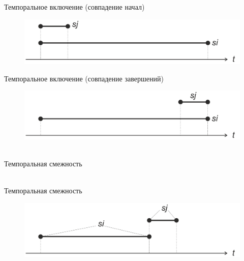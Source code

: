 \begin{frame}{Темпоральное включение (совпадение начал)}
	\topline
	\justifying
	\vspace{10mm}
	\begin{SCn}
		\begin{figure}[H]
			\includegraphics[scale=0.6]{./figures/sd_temp_entities/img_temporal_include_with_match_start_points.png}
		\end{figure}
	\end{SCn}
\end{frame}

\begin{frame}{Темпоральное включение (совпадение завершений)}
	\topline
	\justifying
	\vspace{10mm}
	\begin{SCn}
		\begin{figure}[H]
			\includegraphics[scale=0.6]{./figures/sd_temp_entities/img_temporal_include_with_terminal_point_match.png}
		\end{figure}
	\end{SCn}
\end{frame}

\begin{frame}{\\Темпоральная смежность}
	\topline
	\justifying
\end{frame}

\begin{frame}{\\Темпоральная смежность}
	\topline
	\justifying
	\vspace{10mm}
	\begin{SCn}
		\begin{figure}[H]
			\includegraphics[scale=0.6]{./figures/sd_temp_entities/img_temporal_adjacency.png}
		\end{figure}
	\end{SCn}
\end{frame}

